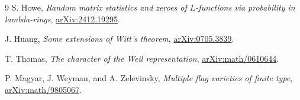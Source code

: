 \documentclass[11pt]{article}
\begin{document}
\begin{thebibliography}{9}
S. Howe, \emph{Random matrix statistics and zeroes of $L$-functions via
probability in lambda-rings}, \href{https://arxiv.org/abs/2412.19295}{arXiv:2412.19295}.

J. Huang, \emph{Some extensions of Witt's theorem},
\href{https://arxiv.org/abs/0705.3839}{arXiv:0705.3839}.

T. Thomas, \emph{The character of the Weil representation},
\href{https://arxiv.org/abs/math/0610644}{arXiv:math/0610644}.

P. Magyar, J. Weyman, and A. Zelevinsky, \emph{Multiple flag varieties of
finite type}, \href{https://arxiv.org/abs/math/9805067}{arXiv:math/9805067}.
\end{thebibliography}
\end{document}
